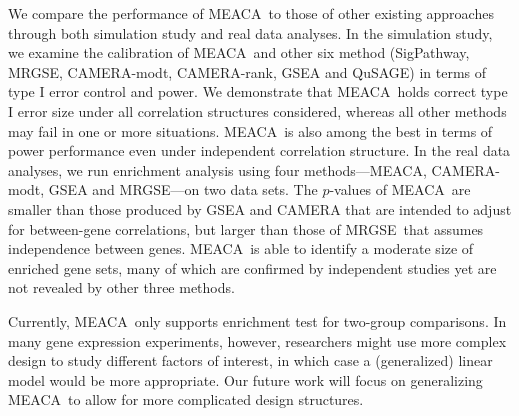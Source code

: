 \documentclass[a4,center,fleqn]{NAR}
\newcommand{\OurMethod}{MEACA}
\newcommand{\CMR}{CAMERA-rank}
\newcommand{\CMT}{CAMERA-modt}
\newcommand{\gent}{SigPathway}
\newcommand{\genr}{MRGSE}
\begin{document}
	 We compare the performance of \OurMethod~to those of other existing approaches through both 
	 simulation study and real data analyses. In the simulation study, we examine the calibration 
	 of \OurMethod~and other six method (\gent, \genr, \CMT, \CMR, GSEA and QuSAGE) in terms of 
	 type I error control and power. We demonstrate that \OurMethod~holds correct type I error size 
	 under all correlation structures considered, whereas all other methods may fail in one or more 
	 situations. \OurMethod~is also among the best in terms of power performance even under 
	 independent correlation structure. In the real data analyses, we run enrichment analysis using 
	 four methods---\OurMethod, \CMT, GSEA and \genr---on two data sets.
	 The $p$-values of \OurMethod~are smaller than those produced by 
	 GSEA and CAMERA that are intended to adjust for between-gene correlations, but 
	 larger than those of \genr~that assumes independence between genes.
	 \OurMethod~is able to identify a moderate size of enriched gene sets, many of which are 
	 confirmed by independent studies yet are not revealed by other three methods.
	 
	 Currently, \OurMethod~only supports enrichment test for two-group comparisons. In
	 many gene expression experiments, however, researchers might use more complex design to study
	 different factors of interest, in which case a (generalized) linear model would be more 
	 appropriate. Our future work will focus on generalizing \OurMethod~to allow for more 
	 complicated design structures. 
	 
\end{document}

